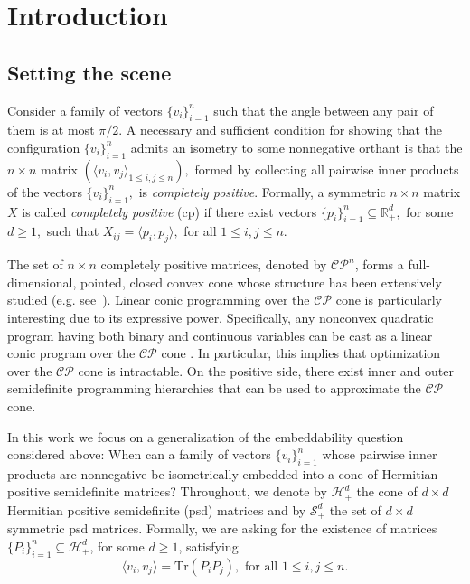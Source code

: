 \documentclass{siamart}
\begin{document}
\section{Introduction}

\subsection{Setting the scene}
Consider a family of vectors $\{v_i\}_{i=1}^n$  such that the angle between any pair of them
is at most $\pi/2$.
A necessary and sufficient condition for showing that the
configuration  $\{v_i\}_{i=1}^n$  admits an  isometry  to {some}
nonnegative orthant  is that the $n\times n$ matrix $({\langle} v_i,v_j{\rangle}_{1\le i,j\le
n}),$  formed by collecting all  pairwise inner products of the
vectors $\{v_i\}_{i=1}^n,$ is \emph{completely positive}. Formally, a
symmetric $n\times  n $ matrix $X$ is called {\em completely
positive} (cp)  if there exist vectors $\{p_i\}_{i=1}^n\subseteq {\mathbb{R}}^d_+,$
for some $d\ge 1,$ such that $X_{ij}={\langle}
p_i,p_j{\rangle},$ for all $1\leq i,j \leq n$.

The set of  $n\times n$ completely positive matrices, denoted  by ${\mathcal{CP}}^n$, forms a full-dimensional, pointed, closed convex cone whose structure   has been   extensively studied  (e.g. see~\cite{CP}). Linear conic programming over the ${\mathcal{CP}}$ cone is  particularly interesting due to its  expressive power. Specifically, any nonconvex quadratic program having  both  binary and continuous variables can be cast as a linear  conic  program over the ${\mathcal{CP}}$ cone \cite{Bur07}. In particular, this implies that  optimization over the ${\mathcal{CP}}$ cone   is intractable. On the positive side, there exist inner \cite{Las12} and outer   \cite{Par00} semidefinite programming hierarchies that can be used to  approximate  the ${\mathcal{CP}}$ cone.

In this work we focus on  a generalization  of the embeddability
question considered  above: When can  a family of vectors
$\{v_i\}_{i=1}^n $ whose pairwise inner products are
nonnegative be isometrically embedded into a
cone of Hermitian positive semidefinite  matrices?  Throughout, {we}
denote by ${\mathcal{H}}^d_+$ the cone  of $d\times d$  Hermitian positive
semidefinite (psd) matrices {and by ${\mathcal{S}}_+^d$ the set of $d\times d$ symmetric psd matrices}.  Formally, we are asking for the
existence of matrices  $\{P_i\}_{i=1}^n\subseteq
{{\mathcal{H}}^{d}_+}$, for some  ${d\ge1}$, satisfying
$${\langle}
v_i,v_j{\rangle}={\mathrm{Tr}}(P_iP_j), \text{ for all }1 \leq i,j\leq n.$$
\end{document}
